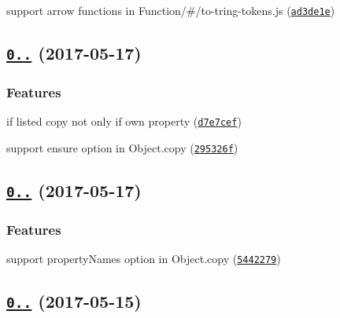 \begin{DoxyItemize}
\item support arrow functions in Function/\#/to-\/tring-\/tokens.js (\href{https://github.com/medikoo/es5-ext/commit/ad3de1e}{\tt ad3de1e})
\end{DoxyItemize}

\label{_0.10.20}%
 \subsection*{\href{https://github.com/medikoo/es5-ext/compare/v0.10.19...v0.10.20}{\tt 0..} (2017-\/05-\/17)}

\subsubsection*{Features}


\begin{DoxyItemize}
\item if listed copy not only if own property (\href{https://github.com/medikoo/es5-ext/commit/d7e7cef}{\tt d7e7cef})
\item support {\ttfamily ensure} option in Object.\+copy (\href{https://github.com/medikoo/es5-ext/commit/295326f}{\tt 295326f})
\end{DoxyItemize}

\label{_0.10.19}%
 \subsection*{\href{https://github.com/medikoo/es5-ext/compare/v0.10.18...v0.10.19}{\tt 0..} (2017-\/05-\/17)}

\subsubsection*{Features}


\begin{DoxyItemize}
\item support property\+Names option in Object.\+copy (\href{https://github.com/medikoo/es5-ext/commit/5442279}{\tt 5442279})
\end{DoxyItemize}

\label{_0.10.18}%
 \subsection*{\href{https://github.com/medikoo/es5-ext/compare/v0.10.17...v0.10.18}{\tt 0..} (2017-\/05-\/15)}

